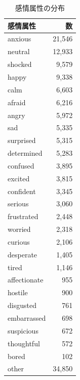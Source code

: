 \documentclass[a4j,12pt,dvipdfmx]{jsreport}
\begin{document}
\begin{table}[htbp]
   \centering
   \begin{minipage}[t]{0.48\linewidth}
      \centering
      \caption{感情属性の分布}
      \label{tab:ci_emotion_enum_stats}
      \begin{tabular}{lr}
         \toprule
         感情属性         & 数        \\
         \midrule
         anxious      & 21{,}546 \\
         neutral      & 12{,}933 \\
         shocked      & 9{,}579  \\
         happy        & 9{,}338  \\
         calm         & 6{,}603  \\
         afraid       & 6{,}216  \\
         angry        & 5{,}972  \\
         sad          & 5{,}335  \\
         surprised    & 5{,}315  \\
         determined   & 5{,}283  \\
         confused     & 3{,}895  \\
         excited      & 3{,}815  \\
         confident    & 3{,}345  \\
         serious      & 3{,}060  \\
         frustrated   & 2{,}448  \\
         worried      & 2{,}318  \\
         curious      & 2{,}106  \\
         desperate    & 1{,}405  \\
         tired        & 1{,}146  \\
         affectionate & 955      \\
         hostile      & 900      \\
         disgusted    & 761      \\
         embarrassed  & 698      \\
         suspicious   & 672      \\
         thoughtful   & 572      \\
         bored        & 102      \\
         other        & 34{,}850 \\
         \bottomrule
      \end{tabular}
   \end{minipage}

\end{table}
\end{document}
